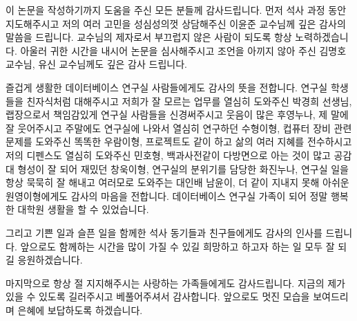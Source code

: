 \documentclass[master,english,final]{kaist-ucs}
\begin{document}

\acknowledgment[4]
    이 논문을 작성하기까지 도움을 주신 모든 분들께 감사드립니다.
    먼저 석사 과정 동안 지도해주시고 저의 여러 고민을 성심성의껏 상담해주신 이윤준 교수님께 깊은 감사의 말씀을 드립니다.
    교수님의 제자로서 부끄럽지 않은 사람이 되도록 항상 노력하겠습니다.
    아울러 귀한 시간을 내시어 논문을 심사해주시고 조언을 아끼지 않아 주신 김명호 교수님, 유신 교수님께도 깊은 감사 드립니다. 
    
    즐겁게 생활한 데이터베이스 연구실 사람들에게도 감사의 뜻을 전합니다.
    연구실 학생들을 친자식처럼 대해주시고 저희가 잘 모르는 업무를 열심히 도와주신 박경희 선생님,
    랩장으로서 책임감있게 연구실 사람들을 신경써주시고 웃음이 많은 후영누나,
    제 말에 잘 웃어주시고 주말에도 연구실에 나와서 열심히 연구하던 수형이형,
    컵퓨터 장비 관련 문제를 도와주신 똑똑한 우람이형,
    프로젝트도 같이 하고 삶의 여러 지혜를 전수하시고 저의 디펜스도 열심히 도와주신 민호형,
    백과사전같이 다방면으로 아는 것이 많고 공감대 형성이 잘 되어 재밌던 창욱이형,
    연구실의 분위기를 담당한 화진누나,
    연구실 일을 항상 묵묵히 잘 해내고 여러모로 도와주는 대인배 남윤이,
    더 같이 지내지 못해 아쉬운 원영이형에게도 감사의 마음을 전합니다.
    데이터베이스 연구실 가족이 되어 정말 행복한 대학원 생활을 할 수 있었습니다.

    그리고 기쁜 일과 슬픈 일을 함께한 석사 동기들과 친구들에게도 감사의 인사를 드립니다.
    앞으로도 함께하는 시간을 많이 가질 수 있길 희망하고 하고자 하는 일 모두 잘 되길 응원하겠습니다.

    마지막으로 항상 절 지지해주시는 사랑하는 가족들에게도 감사드립니다. 
    지금의 제가 있을 수 있도록 길러주시고 베풀어주셔서 감사합니다.
    앞으로도 멋진 모습을 보여드리며 은혜에 보답하도록 하겠습니다.

\curriculumvitae[4]

    \begin{personaldata}
    \end{personaldata}
\end{document}
